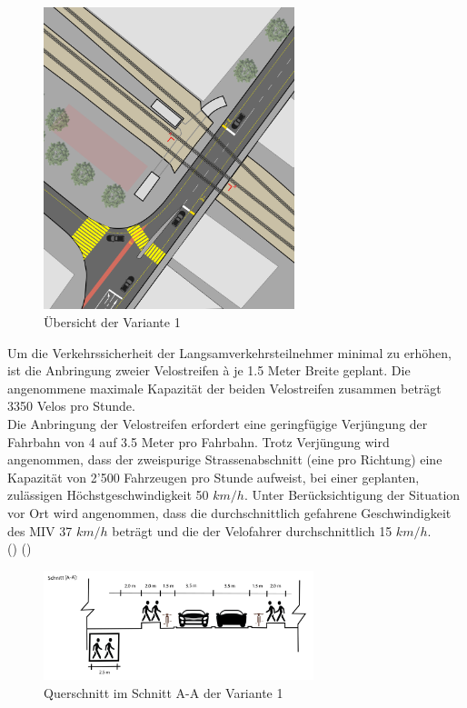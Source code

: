 \begin{figure}[h!]
	\centering
	\includegraphics[width=0.65\textwidth]{figures/f-04-05-01-a-V1}
	\caption[Übersicht Variante 1]{Übersicht der Variante 1}
	\label{img:V1Ü}
\end{figure}

\pagebreak

Um die Verkehrssicherheit der Langsamverkehrsteilnehmer minimal zu erhöhen, ist die Anbringung zweier Velostreifen à je 1.5 Meter Breite geplant. Die angenommene maximale Kapazität der beiden Velostreifen zusammen beträgt 3350 Velos pro Stunde. \\
Die Anbringung der Velostreifen erfordert eine geringfügige Verjüngung der Fahrbahn von 4 auf 3.5 Meter pro Fahrbahn. Trotz Verjüngung wird angenommen, dass der zweispurige Strassenabschnitt (eine pro Richtung) eine Kapazität von 2'500 Fahrzeugen pro Stunde aufweist, bei einer geplanten, zulässigen Höchstgeschwindigkeit 50 $km/h$. Unter Berücksichtigung der Situation vor Ort wird angenommen, dass die durchschnittlich gefahrene Geschwindigkeit des MIV 37 $km/h$ beträgt und die der Velofahrer durchschnittlich 15 $km/h$. \\ (\cite{Nacto2018}) (\cite{Mikrozensus2015})

\begin{figure}[h!]
	\centering
	\includegraphics[width=0.7\textwidth]{figures/f-04-05-01-b-V1}
	\caption[Querschnitt Variante 1]{Querschnitt im Schnitt A-A der Variante 1}
	\label{img:V1Q}
\end{figure}

